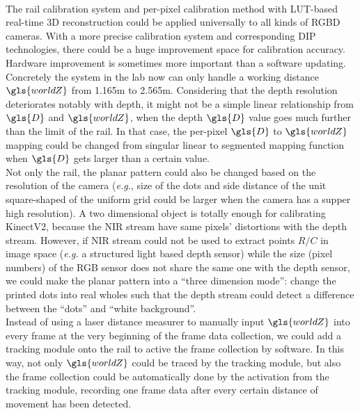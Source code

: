 %
\\\indent
The rail calibration system and per-pixel calibration method with \gls{LUT}-based real-time \gls{3D} reconstruction could be applied universally to all kinds of \gls{RGBD} cameras. With a more precise calibration system and corresponding \gls{DIP} technologies, there could be a huge improvement space for calibration accuracy. Hardware improvement is sometimes more important than a software updating. Concretely the system in the lab now can only handle a working distance \(\gls{worldZ}\) from 1.165m to 2.565m. Considering that the depth resolution deteriorates notably with depth, it might not be a simple linear relationship from \(\gls{D}\) and \(\gls{worldZ}\), when the depth \(\gls{D}\) value goes much further than the limit of the rail. In that case, the per-pixel \(\gls{D}\) to \(\gls{worldZ}\) mapping could be changed from singular linear to segmented mapping function when \(\gls{D}\) gets larger than a certain value.
\\\indent
Not only the rail, the planar pattern could also be changed based on the resolution of the camera (\textit{e.g.}, size of the dots and side distance of the unit square-shaped of the uniform grid could be larger when the camera has a supper high resolution). A two dimensional object is totally enough for calibrating \gls{KinectV2}, because the \gls{NIR} stream have same pixels' distortions with the depth stream. However, if \gls{NIR} stream could not be used to extract points \(R/C\) in image space (\textit{e.g.} a structured light based depth sensor) while the size (pixel numbers) of the RGB sensor does not share the same one with the depth sensor, we could make the planar pattern into a \enquote{three dimension mode}: change the printed dots into real wholes such that the depth stream could detect a difference between the \enquote{dots} and \enquote{white background}. 
\\\indent
Instead of using a laser distance measurer to manually input \(\gls{worldZ}\) into every frame at the very beginning of the frame data collection, we could add a tracking module onto the rail to active the frame collection by software. In this way, not only \(\gls{worldZ}\) could be traced by the tracking module, but also the frame collection could be automatically done by the activation from the tracking module, recording one frame data after every certain distance of movement has been detected. 
